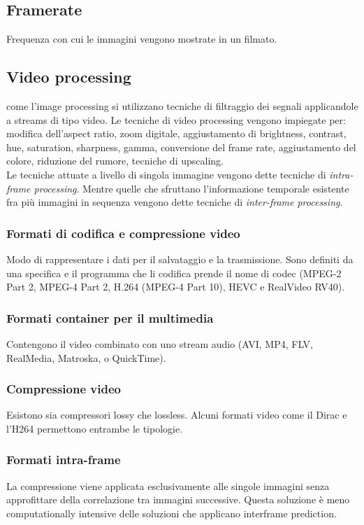\documentclass[8pt,a4paper]{article}
\begin{document}
\begin{multicols}{5}
    \subsection{Framerate}
    Frequenza con cui le immagini vengono mostrate in un filmato. 

    \subsection{Video processing}  come l’image processing si utilizzano tecniche di 
    filtraggio dei segnali applicandole a streams di tipo video. Le tecniche di video 
    processing vengono impiegate per: modifica dell’aspect ratio, zoom digitale, 
    aggiustamento di brightness, contrast, hue, saturation, sharpness, gamma, 
    conversione del frame rate, aggiustamento del colore, riduzione del rumore, 
    tecniche di upscaling. \\
    Le tecniche attuate a livello di singola immagine vengono dette tecniche di 
    \textit{intra-frame processing}. Mentre quelle che sfruttano l’informazione 
    temporale esistente fra più immagini in sequenza vengono dette tecniche di 
    \textit{inter-frame processing}.

    \subsubsection{Formati di codifica e compressione video}
    Modo di rappresentare i dati per il salvataggio e la trasmissione. Sono 
    definiti da una specifica e il programma che li codifica prende il nome di 
    codec (MPEG-2 Part 2, MPEG-4 Part 2, H.264 (MPEG-4 Part 10), HEVC e RealVideo RV40).

    \subsubsection{Formati container per il multimedia}
    Contengono il video combinato con uno stream audio (AVI, MP4, FLV, RealMedia, 
    Matroska, o QuickTime).

    \subsubsection{Compressione video}
    Esistono sia compressori lossy che lossless. Alcuni formati video come il 
    Dirac e l’H264 permettono entrambe le tipologie.

    \subsubsection{Formati intra-frame}
    La compressione viene applicata esclusivamente alle singole immagini senza 
    approfittare della correlazione tra immagini successive. Questa soluzione è meno 
    computationally intensive delle soluzioni che applicano interframe prediction.


\end{multicols}
\end{document}

